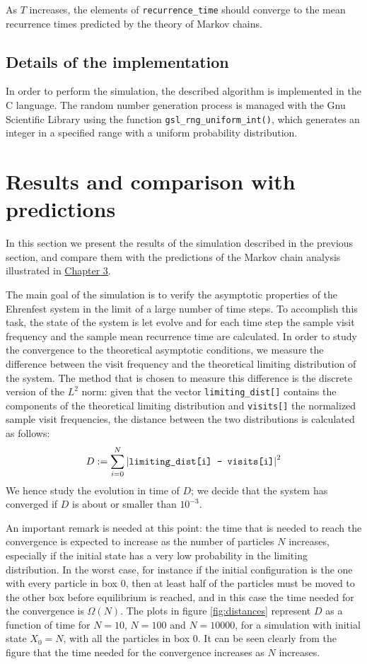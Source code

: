 As $T$ increases, the elements of \texttt{recurrence\_time} should converge to the mean recurrence times predicted by the theory of Markov chains.

\subsection{Details of the implementation}
In order to perform the simulation, the described algorithm is implemented in the C language. The random number generation process is managed with the Gnu Scientific Library using the function \texttt{gsl\_rng\_uniform\_int()}, which generates an integer in a specified range with a uniform probability distribution.

\section{Results and comparison with predictions}
In this section we present the results of the simulation described in the previous section, and compare them with the predictions of the Markov chain analysis illustrated in \hyperref[ch:3]{Chapter 3}.

The main goal of the simulation is to verify the asymptotic properties of the Ehrenfest system in the limit of a large number of time steps. To accomplish this task, the state of the system is let evolve and for each time step the sample visit frequency and the sample mean recurrence time are calculated. In order to study the convergence to the theoretical asymptotic conditions, we measure the difference between the visit frequency and the theoretical limiting distribution of the system. The method that is chosen to measure this difference is the discrete version of the $L^2$ norm: given that the vector \texttt{limiting\_dist[]} contains the components of the theoretical limiting distribution and \texttt{visits[]} the normalized sample visit frequencies, the distance between the two distributions is calculated as follows:
\begin{equation} \label{eq:distance}
    D := \sum_{i = 0}^{N} \left|\text{\texttt{limiting\_dist[i] - visits[i]}} \right| ^2
\end{equation}
We hence study the evolution in time of $D$; we decide that the system has converged if $D$ is about or smaller than $10^{-3}$.

An important remark is needed at this point: the time that is needed to reach the convergence is expected to increase as the number of particles $N$ increases, especially if the initial state has a very low probability in the limiting distribution. In the worst case, for instance if the initial configuration is the one with every particle in box 0, then at least half of the particles must be moved to the other box before equilibrium is reached, and in this case the time needed for the convergence is $\Omega(N)$. The plots in figure \ref{fig:distances} represent $D$ as a function of time for $N = 10$, $N = 100$ and $N = 10000$, for a simulation with initial state $X_0 = N$, \ie with all the particles in box 0. It can be seen clearly from the figure that the time needed for the convergence increases as $N$ increases.

